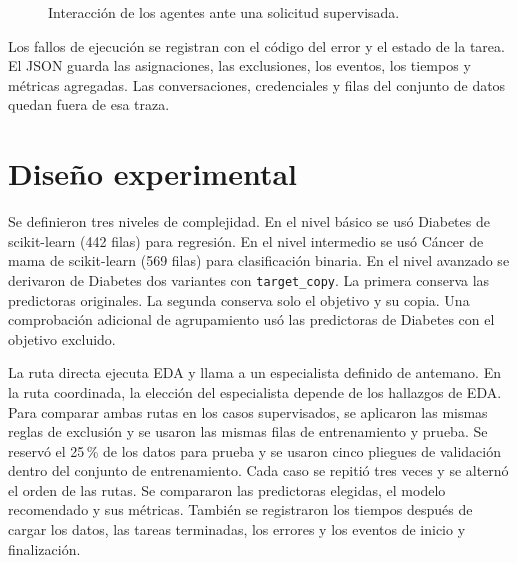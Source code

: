 \documentclass[11pt]{article}
\begin{document}
\begin{figure}[htbp]
\centering
{}
\caption{Interacción de los agentes ante una solicitud supervisada.}
\end{figure}

Los fallos de ejecución se registran con el código del error y el estado de la tarea. El JSON guarda las asignaciones, las exclusiones, los eventos, los tiempos y métricas agregadas. Las conversaciones, credenciales y filas del conjunto de datos quedan fuera de esa traza.

\section{Diseño experimental}

Se definieron tres niveles de complejidad. En el nivel básico se usó Diabetes de scikit-learn (442 filas) para regresión. En el nivel intermedio se usó Cáncer de mama de scikit-learn (569 filas) para clasificación binaria. En el nivel avanzado se derivaron de Diabetes dos variantes con \texttt{target\_copy}. La primera conserva las predictoras originales. La segunda conserva solo el objetivo y su copia. Una comprobación adicional de agrupamiento usó las predictoras de Diabetes con el objetivo excluido.

La ruta directa ejecuta EDA y llama a un especialista definido de antemano. En la ruta coordinada, la elección del especialista depende de los hallazgos de EDA. Para comparar ambas rutas en los casos supervisados, se aplicaron las mismas reglas de exclusión y se usaron las mismas filas de entrenamiento y prueba. Se reservó el 25\,\% de los datos para prueba y se usaron cinco pliegues de validación dentro del conjunto de entrenamiento. Cada caso se repitió tres veces y se alternó el orden de las rutas. Se compararon las predictoras elegidas, el modelo recomendado y sus métricas. También se registraron los tiempos después de cargar los datos, las tareas terminadas, los errores y los eventos de inicio y finalización.
\end{document}
